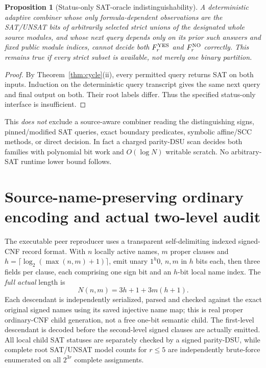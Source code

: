 \documentclass[11pt]{article}
\newtheorem{proposition}[theorem]{Proposition}
\begin{document}
\begin{proposition}[Status-only SAT-oracle indistinguishability]\label{prop:status}
A deterministic adaptive combiner whose only formula-dependent observations are the SAT/UNSAT bits of arbitrarily selected \emph{strict unions of the designated whole source modules}, and whose next query depends only on its prior such answers and fixed public module indices, cannot decide both \(F_r^{\rm YES}\) and \(F_r^{\rm NO}\) correctly. This remains true if every strict subset is available, not merely one binary partition.
\end{proposition}
\begin{proof}
By Theorem~\ref{thm:cycle}(ii), every permitted query returns SAT on both inputs. Induction on the deterministic query transcript gives the same next query and final output on both. Their root labels differ. Thus the specified status-only interface is insufficient.
\end{proof}
This \emph{does not} exclude a source-aware combiner reading the distinguishing signs, pinned/modified SAT queries, exact boundary predicates, symbolic affine/SCC methods, or direct decision. In fact a charged parity-DSU scan decides both families with polynomial bit work and \(O(\log N)\) writable scratch. No arbitrary-SAT runtime lower bound follows.

\section{Source-name-preserving ordinary encoding and actual two-level audit}
The executable peer reproducer uses a transparent self-delimiting indexed signed-CNF record format. With \(n\) locally active names, \(m\) proper clauses and \(h=\lceil\log_2(\max(n,m)+1)\rceil\), emit unary \(1^h0\), \(n,m\) in \(h\) bits each, then three fields per clause, each comprising one sign bit and an \(h\)-bit local name index. The \emph{full actual} length is
\[
N(n,m)=3h+1+3m(h+1).
\]
Each descendant is independently serialized, parsed and checked against the exact original signed names using its saved injective name map; this is real proper ordinary-CNF child generation, not a free one-bit semantic child. The first-level descendant is decoded before the second-level signed clauses are actually emitted. All local child SAT statuses are separately checked by a signed parity-DSU, while complete root SAT/UNSAT model counts for \(r\le5\) are independently brute-force enumerated on all \(2^{3r}\) complete assignments.
\end{document}
